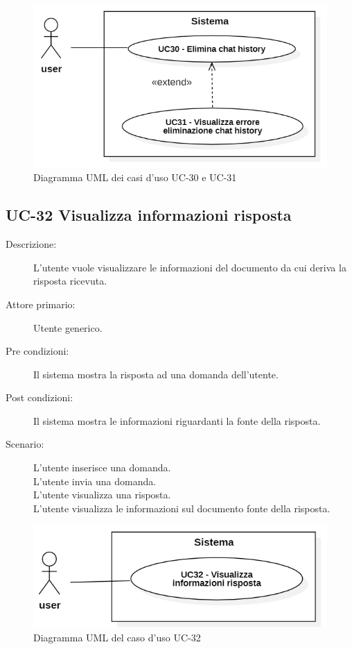 \begin{figure}[H]
    \centering
    \includegraphics[width=0.9\linewidth]{UC30-31.PNG}
    \caption{Diagramma UML dei casi d'uso UC-30 e UC-31}
    \label{fig:UC30-31}
\end{figure}

\subsection{UC-32 Visualizza informazioni risposta}
\begin{description}
    \item[Descrizione:] L'utente vuole visualizzare le informazioni del documento da cui deriva la risposta ricevuta.
    \item[Attore primario:] Utente generico.
    \item[Pre condizioni:] Il sistema mostra la risposta ad una domanda dell'utente.
    \item[Post condizioni:] Il sistema mostra le informazioni riguardanti la fonte della risposta.
    \item[Scenario:] L'utente inserisce una domanda.\\L'utente invia una domanda.\\L'utente visualizza una risposta.\\L'utente visualizza le informazioni sul documento fonte della risposta.
\end{description}

\begin{figure}[H]
    \centering
    \includegraphics[width=0.9\linewidth]{UC32.PNG}
    \caption{Diagramma UML del caso d'uso UC-32}
    \label{fig:UC32}
\end{figure}


